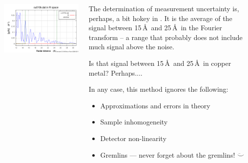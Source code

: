 \documentclass[10pt, xcolor=x11names, compress]{beamer}
\begin{document}
\begin{frame}
\begin{columns}
\begin{column}{0.3\linewidth}
      \includegraphics[width=\linewidth]{info/cu_chir12_31.png}      
    \end{column}
    \begin{column}{0.7\linewidth}
      The determination of measurement uncertainty is, perhaps, a bit
      hokey in {\ifeffit}.  It is the average of the signal between
      15\,\AA\ and 25\,\AA\ in the Fourier transform -- a range that
      probably does not include much signal above the noise.

      \bigskip

      Is that signal between 15\,\AA\ and 25\,\AA\ in copper metal?
      Perhaps....

      \bigskip

      In any case, this method ignores the following:
      \begin{itemize}
      \item Approximations and errors in theory
      \item Sample inhomogeneity
      \item Detector non-linearity
      \item Gremlins --- never forget about the gremlins! $\ddot\smile$
      \end{itemize}
    \end{column}
  \end{columns}
\end{frame}
\end{document}
